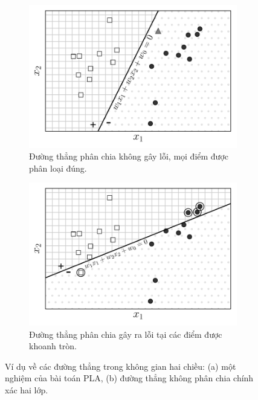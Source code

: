


\begin{figure}[t]
\begin{subfigure}{0.49\textwidth}
\includegraphics[width=0.99\linewidth]{ebookML_src/src/perceptron/pla4.pdf}
\caption{Đường thẳng phân chia không gây lỗi, mọi điểm được phân loại đúng.}
\label{fig:9_2a}
\end{subfigure}
\begin{subfigure}{0.49\textwidth}
\includegraphics[width=0.99\linewidth]{ebookML_src/src/perceptron/pla3.pdf}
\caption{Đường thẳng phân chia gây ra lỗi tại các điểm được khoanh tròn.}
\label{fig:9_2b}
\end{subfigure}
\caption{
Ví dụ về các đường thẳng trong không gian hai chiều: (a) một nghiệm của bài toán PLA, (b) đường thẳng không phân chia chính xác hai lớp.
}
\label{fig:9_2}
\end{figure}

